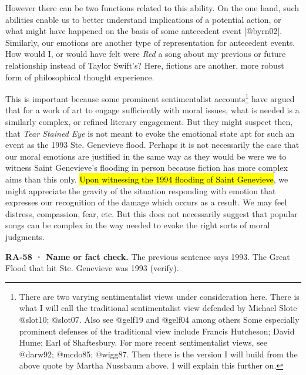 \documentclass[
  letterpaper,
  DIV=11,
  numbers=noendperiod]{scrartcl}
\theoremstyle{remark}
\begin{document}
However there can be two functions related to this ability. On the one
hand, such abilities enable us to better understand implications of a
potential action, or what might have happened on the basis of some
antecedent event {[}@byrn02{]}. Similarly, our emotions are another type
of representation for antecedent events. How would I, or would have felt
were \emph{Red} a song about my previous or future relationship instead
of Taylor Swift's? Here, fictions are another, more robust form of
philosophical thought experience.

This is important because some prominent sentimentalist
accounts\footnote{There are two varying sentimentalist views under
  consideration here. There is what I will call the traditional
  sentimentalist view defended by Michael Slote @slot10; @slot07. Also
  see @gelf19 and @gelf04 among others Some especially prominent
  defenses of the traditional view include Francis Hutcheson; David
  Hume; Earl of Shaftesbury. For more recent sentimentalist views, see
  @darw92; @mcdo85; @wigg87. Then there is the version I will build from
  the above quote by Martha Nussbaum above. I will explain this further
  on.} have argued that for a work of art to engage sufficiently with
moral issues, what is needed is a similarly complex, or refined literary
engagement. But they might suspect then, that \emph{Tear Stained Eye} is
not meant to evoke the emotional state apt for such an event as the 1993
Ste. Genevieve flood. Perhaps it is not necessarily the case that our
moral emotions are justified in the same way as they would be were we to
witness Saint Genevieve's flooding in person because fiction has more
complex aims than this only. \hl{Upon witnessing the 1994 flooding of
Saint Genevieve}, we might appreciate the gravity of the situation
responding with emotion that expresses our recognition of the damage
which occurs as a result. We may feel distress, compassion, fear, etc.
But this does not necessarily suggest that popular songs can be complex
in the way needed to evoke the right sorts of moral judgments.

\begin{tcolorbox}[enhanced jigsaw, arc=.35mm, bottomrule=.15mm, bottomtitle=1mm, breakable, colback=white, colbacktitle=quarto-callout-caution-color!10!white, colframe=quarto-callout-caution-color-frame, coltitle=black, left=2mm, leftrule=.75mm, opacityback=0, opacitybacktitle=0.6, rightrule=.15mm, title=\textcolor{quarto-callout-caution-color}{\faFire}\hspace{0.5em}{Caution}, titlerule=0mm, toprule=.15mm, toptitle=1mm]

\textbf{RA-58 · Name or fact check.} The previous sentence says 1993.
The Great Flood that hit Ste. Genevieve was 1993 (verify).

\end{tcolorbox}
\end{document}
